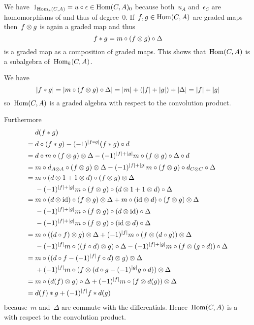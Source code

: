 We have~$1_{\operatorname{Hom}_k(C,A)} = u \circ \epsilon \in \operatorname{Hom}(C,A)_0$ because both~$u_A$ and~$\epsilon_C$ are homomorphisms of {\dgvs} and thus of degree~$0$.
If~$f, g \in \operatorname{Hom}(C,A)$ are graded maps then~$f \otimes g$ is again a graded map and thus
\[
  f * g
  =
  m \circ (f \otimes g) \circ \Delta
\]
is a graded map as a composition of graded maps.
This shows that~$\operatorname{Hom}(C,A)$ is a subalgebra of~$\operatorname{Hom}_k(C,A)$.

We have
\[
  \lvert f * g\rvert
  =
  \lvert m \circ (f \otimes g) \circ \Delta\rvert
  =
  \lvert m\rvert + (\lvert f\rvert + \lvert g\rvert) + \lvert\Delta\rvert
  =
  \lvert f\rvert + \lvert g\rvert
\]
so~$\operatorname{Hom}(C,A)$ is a graded algebra with respect to the convolution product.

Furthermore
\begingroup
\allowdisplaybreaks
\begin{align*}
  {}&
  d(f * g)
  \\
  ={}&
  d \circ (f * g)
  -
  (-1)^{\lvert f * g\rvert} (f * g) \circ d
  \\
  ={}&
  d \circ m \circ (f \otimes g) \otimes \Delta
  -
  (-1)^{\lvert f\rvert + \lvert g\rvert}
  m \circ (f \otimes g) \circ \Delta \circ d
  \\
  ={}&
  m \circ d_{A \otimes A} \circ (f \otimes g) \otimes \Delta
  -
  (-1)^{\lvert f\rvert + \lvert g\rvert}
  m \circ (f \otimes g) \circ d_{C \otimes C} \circ \Delta
  \\
  ={}&
  m \circ (d \otimes 1 + 1 \otimes d) \circ (f \otimes g) \otimes \Delta
  \\
  {}&
  -
  (-1)^{\lvert f\rvert + \lvert g\rvert}
  m \circ (f \otimes g) \circ (d \otimes 1 + 1 \otimes d) \circ \Delta
  \\
  ={}&
    m \circ (d \otimes {\operatorname{id}}) \circ (f \otimes g) \otimes \Delta
  + m \circ ({\operatorname{id}} \otimes d) \circ (f \otimes g) \otimes \Delta
  \\
  {}&
  - (-1)^{\lvert f\rvert + \lvert g\rvert} m \circ (f \otimes g) \circ (d \otimes {\operatorname{id}}) \circ \Delta
  \\
  {}&
  - (-1)^{\lvert f\rvert + \lvert g\rvert} m \circ (f \otimes g) \circ ({\operatorname{id}} \otimes d) \circ \Delta
  \\
  ={}&
    m \circ ((d \circ f) \otimes g) \otimes \Delta
  + (-1)^{\lvert f\rvert} m \circ (f \otimes (d \circ g)) \otimes \Delta
  \\
  {}&
  - (-1)^{\lvert f\rvert} m \circ ((f \circ d) \otimes g) \circ \Delta
  - (-1)^{\lvert f\rvert + \lvert g\rvert} m \circ (f \otimes (g \circ d))\circ \Delta
  \\
  ={}&
    m \circ ((d \circ f - (-1)^{\lvert f\rvert} f \circ d) \otimes g) \otimes \Delta
  \\
  {}&
  + (-1)^{\lvert f\rvert} m \circ (f \otimes (d \circ g - (-1)^{\lvert g\rvert} g \circ d)) \otimes \Delta
  \\
  ={}&
    m \circ (d(f) \otimes g) \circ \Delta
  + (-1)^{\lvert f\rvert} m \circ (f \otimes d(g)) \otimes \Delta
  \\
  ={}&
  d(f) * g + (-1)^{\lvert f\rvert} f * d(g)
\end{align*}
\endgroup
because~$m$ and~$\Delta$ are commute with the differentials.
Hence~$\operatorname{Hom}(C,A)$ is a {\dga} with respect to the convolution product.

